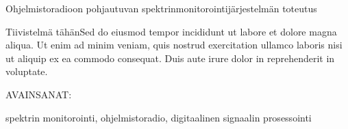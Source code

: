 \vspace{10mm}
{\huge Ohjelmistoradioon pohjautuvan spektrinmonitorointijärjestelmän toteutus \par}

\vspace{10mm}

Tiivistelmä tähänSed do eiusmod tempor
incididunt ut labore et dolore magna aliqua. Ut enim ad minim veniam,
quis nostrud exercitation ullamco laboris nisi ut aliquip ex ea commodo
consequat. Duis aute irure dolor in reprehenderit in voluptate.

\vspace{30mm}

AVAINSANAT:

spektrin monitorointi, ohjelmistoradio, digitaalinen signaalin prosessointi

